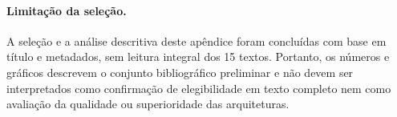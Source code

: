 \paragraph{Limitação da seleção.}
A seleção e a análise descritiva deste apêndice foram concluídas com base em título e metadados, sem leitura integral dos 15 textos. Portanto, os números e gráficos descrevem o conjunto bibliográfico preliminar e não devem ser interpretados como confirmação de elegibilidade em texto completo nem como avaliação da qualidade ou superioridade das arquiteturas.
